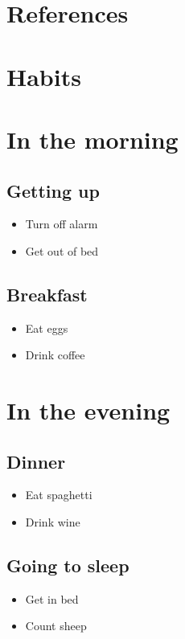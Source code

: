 \documentclass[
  letterpaper,
  DIV=11,
  numbers=noendperiod]{scrreprt}
\providecommand{\tightlist}{%
  \setlength{\itemsep}{0pt}\setlength{\parskip}{0pt}}\usepackage{longtable,booktabs,array}
\newlength{\cslhangindent}
\newenvironment{CSLReferences}[2] %
 {\begin{list}{}{%
  \setlength{\itemindent}{0pt}
  \setlength{\leftmargin}{0pt}
  \setlength{\parsep}{0pt}
  \ifodd #1
   \setlength{\leftmargin}{\cslhangindent}
   \setlength{\itemindent}{-1\cslhangindent}
  \fi
  \setlength{\itemsep}{#2\baselineskip}}}
 {\end{list}}
\begin{document}

\chapter*{References}\label{references}


\label{refs}
\begin{CSLReferences}{0}{1}
\end{CSLReferences}


\chapter{Habits}\label{habits}


\chapter{In the morning}\label{in-the-morning}

\section{Getting up}\label{getting-up}

\begin{itemize}
\tightlist
\item
  Turn off alarm
\item
  Get out of bed
\end{itemize}

\section{Breakfast}\label{breakfast}

\begin{itemize}
\tightlist
\item
  Eat eggs
\item
  Drink coffee
\end{itemize}


\chapter{In the evening}\label{in-the-evening}

\section{Dinner}\label{dinner}

\begin{itemize}
\tightlist
\item
  Eat spaghetti
\item
  Drink wine
\end{itemize}

\section{Going to sleep}\label{going-to-sleep}

\begin{itemize}
\tightlist
\item
  Get in bed
\item
  Count sheep
\end{itemize}
\end{document}
